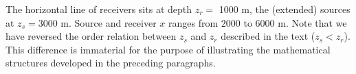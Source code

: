 

The horizontal line of receivers sits at depth $z_r = $ 1000 m, the
(extended) sources at $z_s=3000$ m.  %
Source and receiver $x$ ranges from $2000$ to
$6000$ m. Note that we have
reversed the order relation between $z_s$ and $z_r$ described in the
text ($z_s<z_r$). This difference is immaterial for the purpose of
illustrating the mathematical structures developed in the preceding paragraphs.



